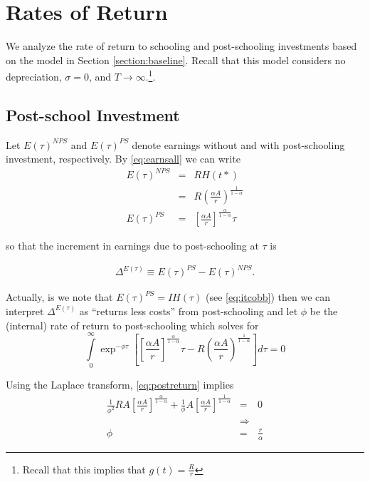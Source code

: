 \section{Rates of Return}
We analyze the rate of return to schooling and post-schooling investments based on the model in Section \ref{section:baseline}. Recall that this model considers no depreciation, $\sigma = 0$, and $T \rightarrow \infty$.\footnote{Recall that this implies that $g(t) = \frac{R}{r}$}.
\subsection{Post-school Investment}
Let $E(\tau)^{NPS}$ and $E(\tau)^{PS}$ denote earnings without and with post-schooling investment, respectively. By \eqref{eq:earnsall} we can write
\begin{eqnarray}
E(\tau)^{NPS} &=& R H(t*) \\ \nonumber
&=& R \left( \frac{\alpha A}{r} \right)^{\frac{1}{1 - \alpha}} \\ \nonumber
E(\tau)^{PS} &=& \left[ \frac{\alpha A}{r} \right]^{\frac{\alpha}{1-\alpha}} \tau
\end{eqnarray}

\noindent so that the increment in earnings due to post-schooling at $\tau$ is

\begin{eqnarray}
\Delta^{E(\tau)} \equiv E(\tau)^{PS} - E(\tau)^{NPS}.
\end{eqnarray}

\indent Actually, is we note that $E(\tau)^{PS} = IH(\tau)$ (see \eqref{eq:itcobb}) then we can interpret $\Delta^{E(\tau)}$ as ``returns less costs'' from post-schooling and let $\phi$ be the (internal) rate of return to post-schooling which solves for
\begin{equation}
\int \limits _{0} ^{\infty} \exp^{- \phi \tau} \left[ \left[ \frac{\alpha A}{r} \right]^{\frac{\alpha}{1-\alpha}} \tau - R \left( \frac{\alpha A}{r} \right)^{\frac{1}{1 - \alpha}} \right] d \tau = 0 \label{eq:postreturn}
\end{equation}  

\noindent Using the Laplace transform, \eqref{eq:postreturn} implies
\begin{eqnarray}
\frac{1}{\phi^2} RA \left[ \frac{\alpha A}{r} \right]^{\frac{\alpha}{1-\alpha}} + \frac{1}{\phi} A \left[ \frac{\alpha A}{r} \right]^{\frac{1}{1-\alpha}} &=& 0 \nonumber \\
&\Rightarrow& \nonumber \\
\phi &=& \frac{r}{\alpha}
\end{eqnarray}

